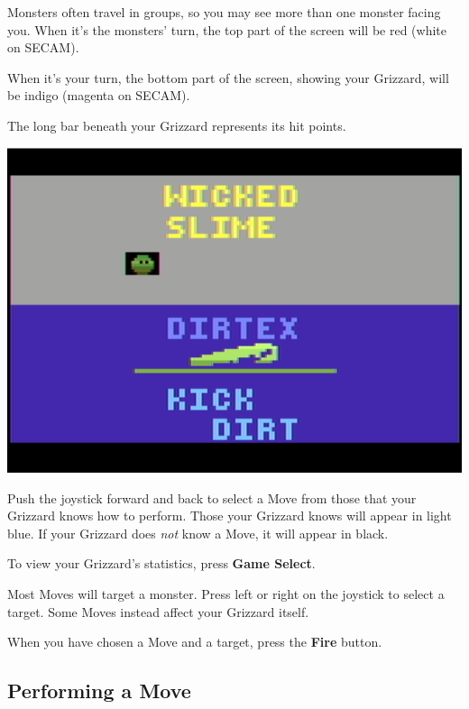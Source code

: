 \documentclass[9pt,twocolumn,openany,article]{memoir}
\begin{document}
Monsters often  travel in groups, so  you may see more  than one monster
facing you.  When it's the  monsters' turn, the  top part of  the screen
will be red (white on SECAM).

When  it's your  turn,  the  bottom part  of  the  screen, showing  your
Grizzard, will be indigo (magenta on SECAM).

The long bar beneath your Grizzard represents its hit points.

\begin{center}
  \includegraphics[width=.6667\columnwidth]{../Manual/GrizzardCombatNTSC.png}
\end{center}

Push the joystick forward and back to select a Move from those that your
Grizzard knows how to perform. Those  your Grizzard knows will appear in
light blue. If your Grizzard does \emph{not} know a Move, it will appear
in black.

To view your Grizzard's statistics, press \textbf{Game Select}.

Most Moves will target a monster. Press left or right on the joystick to
select a target. Some Moves instead affect your Grizzard itself.

When   you   have   chosen   a    Move   and   a   target,   press   the
\textbf{Fire} button.


\subsection{Performing a Move}
\end{document}
